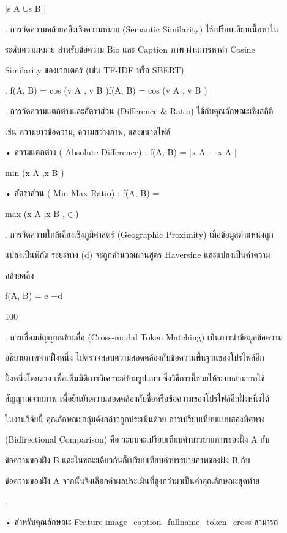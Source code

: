 \documentclass[12pt,a4paper]{report}
\begin{document}
|s A \ensuremath{\cup}s B |\par
{}. การวัดความคล้ายคลึงเชิงความหมาย (Semantic Similarity) ใช้เปรียบเทียบเนื้อหาใน\par
ระดับความหมาย สำหรับข้อความ Bio และ Caption ภาพ ผ่านการหาค่า Cosine\par
Similarity ของเวกเตอร์ (เช่น TF-IDF หรือ SBERT)\par
{}. f(A, B) = cos (v A , v B )f(A, B) = cos (v A , v B )\par
\clearpage
{}. การวัดความแตกต่างและอัตราส่วน (Difference \& Ratio) ใช้กับคุณลักษณะเชิงสถิติ\par
เช่น ความยาวข้อความ, ความสว่างภาพ, และขนาดไฟล์\par
\noindent • ความแตกต่าง ( Absolute Difference) : f(A, B) = |x A − x A |\par
min (x A ,x B )\par
\noindent • อัตราส่วน ( Min-Max Ratio) : f(A, B) =\par
max (x A ,x B ,\ensuremath{\in})\par
{}. การวัดความใกล้เคียงเชิงภูมิศาสตร์ (Geographic Proximity) เมื่อข้อมูลตำแหน่งถูก\par
แปลงเป็นพิกัด ระยะทาง (d) จะถูกคำนวณผ่านสูตร Haversine และแปลงเป็นค่าความ\par
คล้ายคลึง\par
f(A, B) = e −d\par
100\par
{}. การเชื่อมสัญญาณข้ามสื่อ (Cross-modal Token Matching) เป็นการนำข้อมูลข้อความ\par
อธิบายภาพจากฝั่งหนึ่ง ไปตรวจสอบความสอดคล้องกับข้อความพื้นฐานของโปรไฟล์อีก\par
ฝั่งหนึ่งโดยตรง เพื่อเพิ่มมิติการวิเคราะห์ข้ามรูปแบบ ซึ่งวิธีการนี้ช่วยให้ระบบสามารถใช้\par
สัญญาณจากภาพ เพื่อยืนยันความสอดคล้องกับชื่อหรือข้อความของโปรไฟล์อีกฝั่งหนึ่งได้\par
ในงานวิจัยนี้ คุณลักษณะกลุ่มดังกล่าวถูกประเมินด้วย การเปรียบเทียบแบบสองทิศทาง\par
(Bidirectional Comparison) คือ ระบบจะเปรียบเทียบคำบรรยายภาพของฝั่ง A กับ\par
ข้อความของฝั่ง B และในขณะเดียวกันก็เปรียบเทียบคำบรรยายภาพของฝั่ง B กับ\par
ข้อความของฝั่ง A จากนั้นจึงเลือกค่าผลประเมินที่สูงกว่ามาเป็นค่าคุณลักษณะสุดท้าย\par
{}.\par
\noindent • สำหรับคุณลักษณะ Feature image\_caption\_fullname\_token\_cross สามารถ\par
\end{document}
